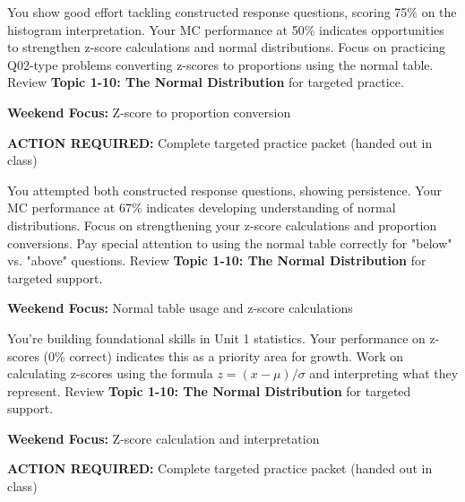 \documentclass[11pt]{article}
\begin{document}
\vspace{0.15in}

\begin{tcolorbox}[colback=yellow!10!white,colframe=orange!75!black,title=\textbf{Janelle} (mango\_panda) - L10: 3/6 (50\%) \textcolor{red}{RED}]
You show good effort tackling constructed response questions, scoring 75\% on the histogram interpretation. Your MC performance at 50\% indicates opportunities to strengthen z-score calculations and normal distributions. Focus on practicing Q02-type problems converting z-scores to proportions using the normal table. Review \textbf{Topic 1-10: The Normal Distribution} for targeted practice.

\vspace{0.1in}
\textbf{Weekend Focus:} Z-score to proportion conversion

\textbf{ACTION REQUIRED:} Complete targeted practice packet (handed out in class)
\end{tcolorbox}

\newpage

\begin{tcolorbox}[colback=yellow!10!white,colframe=yellow!75!black,title=\textbf{Hazel} (apple\_rabbit) - L10: 4/6 (67\%) \textcolor{orange}{YELLOW}]
You attempted both constructed response questions, showing persistence. Your MC performance at 67\% indicates developing understanding of normal distributions. Focus on strengthening your z-score calculations and proportion conversions. Pay special attention to using the normal table correctly for "below" vs. "above" questions. Review \textbf{Topic 1-10: The Normal Distribution} for targeted support.

\vspace{0.1in}
\textbf{Weekend Focus:} Normal table usage and z-score calculations
\end{tcolorbox}

\vspace{0.15in}

\begin{tcolorbox}[colback=red!10!white,colframe=red!75!black,title=\textbf{Gabriella} (guava\_cat) - L10: 3/6 (50\%) \textcolor{red}{RED}]
You're building foundational skills in Unit 1 statistics. Your performance on z-scores (0\% correct) indicates this as a priority area for growth. Work on calculating z-scores using the formula $z = (x - \mu) / \sigma$ and interpreting what they represent. Review \textbf{Topic 1-10: The Normal Distribution} for targeted support.

\vspace{0.1in}
\textbf{Weekend Focus:} Z-score calculation and interpretation

\textbf{ACTION REQUIRED:} Complete targeted practice packet (handed out in class)
\end{tcolorbox}
\end{document}
